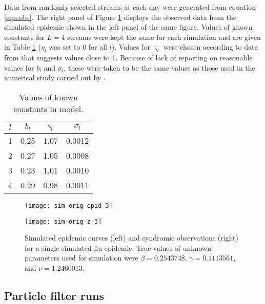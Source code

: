 \documentclass{elsarticle}
\begin{document}
Data from randomly selected streams at each day were generated from equation \eqref{eqn:obs}. The right panel of Figure \ref{fig:data} displays the observed data from the simulated epidemic shown in the left panel of the same figure. Values of known constants for $L = 4$ streams were kept the same for each simulation and are given in Table \ref{tab:constants} ($\eta_l$ was set to 0 for all $l$). Values for $\varsigma_l$ were chosen according to data from \citet{chew2010twitter} that suggests values close to 1. Because of lack of reporting on reasonable values for $b_l$ and $\sigma_l$, these were taken to be the same values as those used in the numerical study carried out by \citet{skvortsov2012monitoring}.

\begin{table}[hb]
\begin{center}
\begin{tabular}{|cccc|}
\hline
$l$ & $b_l$ & $\varsigma_l$ & $\sigma_l$ \\
\hline
1 & 0.25 & 1.07 & 0.0012 \\
2 & 0.27 & 1.05 & 0.0008 \\
3 & 0.23 & 1.01 & 0.0010 \\
4 & 0.29 & 0.98 & 0.0011 \\
\hline
\end{tabular}
\caption{Values of known constants in model.}
\label{tab:constants}
\end{center}
\end{table}

\begin{figure}
\centering
\begin{minipage}{0.48\linewidth}
\texttt{[image: sim-orig-epid-3]}
\end{minipage}
\begin{minipage}{0.48\linewidth}
\texttt{[image: sim-orig-z-3]}
\end{minipage}
\caption{Simulated epidemic curves (left) and syndromic observations (right) for a single simulated flu epidemic. True values of unknown parameters used for simulation were $\beta = 0.2543748$, $\gamma = 0.1113561$, and $\nu = 1.2460013$.} \label{fig:data}
\end{figure}

\subsection{Particle filter runs} \label{sec:pf}
\end{document}
